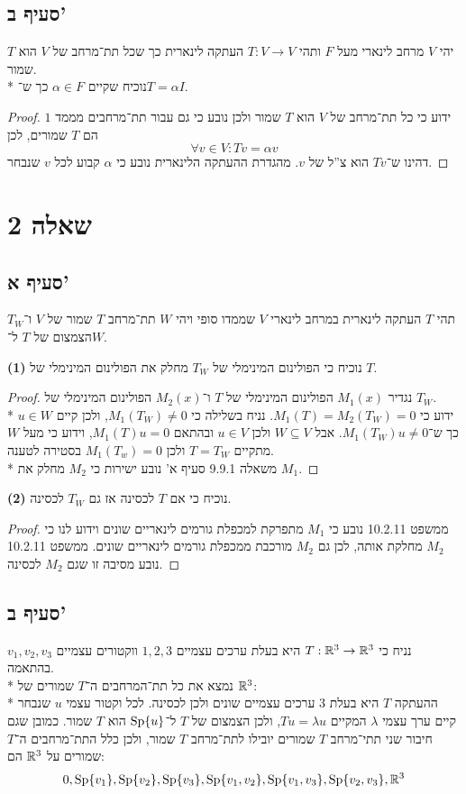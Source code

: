 \subsection{סעיף ב'}
יהי $V$ מרחב לינארי מעל $F$ ותהי $T : V \to V$ העתקה לינארית כך שכל תת־מרחב של $V$ הוא $T$ שמור. \\*
נוכיח שקיים $\alpha \in F$ כך ש־$T = \alpha I$.
\begin{proof}
	ידוע כי כל תת־מרחב של $V$ הוא $T$ שמור ולכן נובע כי גם עבור תת־מרחבים מממד $1$ הם $T$ שמורים, לכן
	\[
		\forall v \in V: T v = \alpha v
	\]
	דהינו ש־$T v$ הוא צ''ל של $v$. מהגדרת ההעתקה הלינארית נובע כי $\alpha$ קבוע לכל $v$ שנבחר.
\end{proof}

\section{שאלה 2}
\subsection{סעיף א'}
תהי $T$ העתקה לינארית במרחב לינארי $V$ שממדו סופי ויהי $W$ תת־מרחב $T$ שמור של $V$ ו־$T_W$ הצמצום של $T$ ל־$W$.

\textbf{(1)}
נוכיח כי הפולינום המינימלי של $T_W$ מחלק את הפולינום המינימלי של $T$.
\begin{proof}
	נגדיר $M_1(x)$ הפולינום המינימלי של $T$ ו־$M_2(x)$ הפולינום המינימלי של $T_W$. \\*
	ידוע כי $M_1(T) = M_2(T_W) = 0$. נניח בשלילה כי $M_1(T_W) \ne 0$, ולכן קיים $u \in W$ כך ש־$M_1(T_W) u \ne 0$.
	אבל $W \subseteq V$ ולכן $u \in V$ ובהתאם $M_1(T) u = 0$, וידוע כי מעל $W$ מתקיים $T = T_W$ ולכן $M_1(T_w) = 0$ בסטירה לטענה. \\*
	משאלה 9.9.1 סעיף א' נובע ישירות כי $M_2$ מחלק את $M_1$.
\end{proof}
\textbf{(2)}
נוכיח כי אם $T$ לכסינה אז גם $T_W$ לכסינה.
\begin{proof}
	ממשפט 10.2.11 נובע כי $M_1$ מתפרקת למכפלת גורמים לינאריים שונים וידוע לנו כי $M_2$ מחלקת אותה,
	לכן גם $M_2$ מורכבת ממכפלת גורמים לינאריים שונים. ממשפט 10.2.11 נובע מסיבה זו שגם $M_2$ לכסינה.
\end{proof}

\subsection{סעיף ב'}
נניח כי $T : \mathbb{R}^3 \to \mathbb{R}^3$ היא בעלת ערכים עצמיים $1, 2, 3$ ווקטורים עצמיים $v_1, v_2, v_3$ בהתאמה. \\*
נמצא את כל תת־המרחבים ה־$T$ שמורים של $\mathbb{R}^3$: \\*
ההעתקה $T$ היא בעלת $3$ ערכים עצמיים שונים ולכן לכסינה. לכל וקטור עצמי $u$ שנבחר קיים ערך עצמי $\lambda$ המקיים $T u = \lambda u$,
ולכן הצמצום של $T$ ל־$\operatorname{Sp}\{ u \}$ הוא $T$ שמור.
כמובן שגם חיבור שני תתי־מרחב $T$ שמורים יובילו לתת־מרחב $T$ שמור, ולכן כלל התת־מרחבים ה־$T$ שמורים על $\mathbb{R}^3$ הם:
\[
	0,
	\operatorname{Sp}\{ v_1 \},
	\operatorname{Sp}\{ v_2 \},
	\operatorname{Sp}\{ v_3 \},
	\operatorname{Sp}\{ v_1, v_2 \},
	\operatorname{Sp}\{ v_1, v_3 \},
	\operatorname{Sp}\{ v_2, v_3 \},
	\mathbb{R}^3
\]

